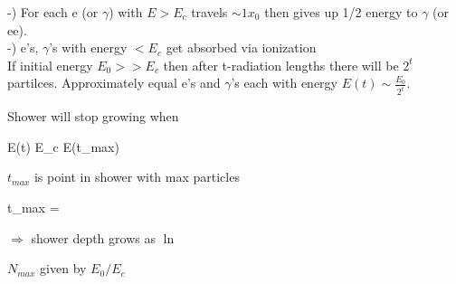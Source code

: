 {\begin{minipage}{0.5\textwidth}
-) For each e (or $\gamma$) with $E > E_c$ travels $\sim 1 x_0$ then gives up 1/2 energy to $\gamma$ (or ee).\\

-) e's, $\gamma$'s with energy $< E_c$ get absorbed via ionization\\

If initial energy $E_0 >> E_c$ then after t-radiation lengths there will be $2^t$ partilces. 
Approximately equal e's and $\gamma$'s each with energy $E(t) \sim \frac{E_0 }{2^t}$.

\end{minipage} 

Shower will stop growing when 

\be
E(t) \simeq E_c \equiv E(t_{max})
\ee

$t_{max}$ is point in shower with max particles


\be
t_{max} = 
\ee

$\Rightarrow$ shower depth grows as $\ln$

$N_{max}$ given by $E_0/E_c$

}



